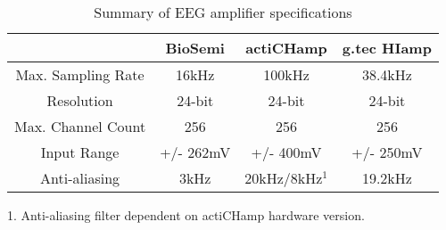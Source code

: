 \begin{table}[]
\centering
\caption{Summary of EEG amplifier specifications} 
\label{tableeeg}
\begin{tabular}{|c|c|c|c|}
\hline
\textbf{}          & \textbf{BioSemi} & \textbf{actiCHamp} & \textbf{g.tec HIamp} \\ \hline
Max. Sampling Rate & 16kHz            & 100kHz             & 38.4kHz              \\ \hline
Resolution         & 24-bit           & 24-bit             & 24-bit               \\ \hline
Max. Channel Count      & 256              & 256                & 256                  \\ \hline
Input Range      & +/- 262mV            & +/- 400mV          & +/- 250mV            \\ \hline
Anti-aliasing      & 3kHz             & 20kHz/8kHz$^{1}$         &  19.2kHz      \\ \hline
\end{tabular}
\end{table}

1. Anti-aliasing filter dependent on actiCHamp hardware version.